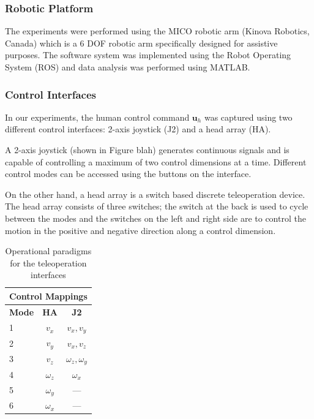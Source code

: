 \documentclass[conference]{IEEEtran}
\begin{document}
\subsubsection{Robotic Platform}
The experiments were performed using the MICO robotic arm (Kinova Robotics, Canada) which is a 6 DOF robotic arm specifically designed for assistive purposes. The software system was implemented using the Robot Operating System (ROS) and data analysis was performed using MATLAB. 
\subsubsection{Control Interfaces}
In our experiments, the human control command $\boldsymbol{u}_h$ was captured using two different control interfaces: 2-axis joystick (J2) and a head array (HA). 

A 2-axis joystick (shown in Figure blah) generates continuous signals and is capable of controlling a maximum of two control dimensions at a time. Different control modes can be accessed using the buttons on the interface. 

On the other hand, a head array is a switch based discrete teleoperation device. The head array consists of three switches; the switch at the back is used to cycle between the modes and the switches on the left and right side are to control the motion in the positive and negative direction along a control dimension. 
	\begin{table}
	\centering
	\begin{tabular}{|l|c|c|}
		\hline
		\multicolumn{3}{|c|}{Control Mappings} \\
		\hline
		\textbf{Mode} & \textbf{HA} & \textbf{J2}\\
		\hline
		1 & $v_{x}$ & $v_{x}, v_{y}$ \\ \hline
		2 & $v_{y}$   & $v_{x}, v_{z}$ \\ \hline
		3 & $v_{z}$ &  $\omega_{z}, \omega_{y}$ \\ \hline
		4 & $\omega_{z}$   & $\omega_{x}$ \\ \hline
		5 &  $\omega_{y}$  & ---  \\ \hline
		6 & $\omega_{x}$   & ---  \\ \hline
	\end{tabular}
	\vspace{.2cm}
	\caption{Operational paradigms for the teleoperation interfaces} 
	\label{CIM}
	\vspace{-.5cm}
\end{table}
\end{document}
